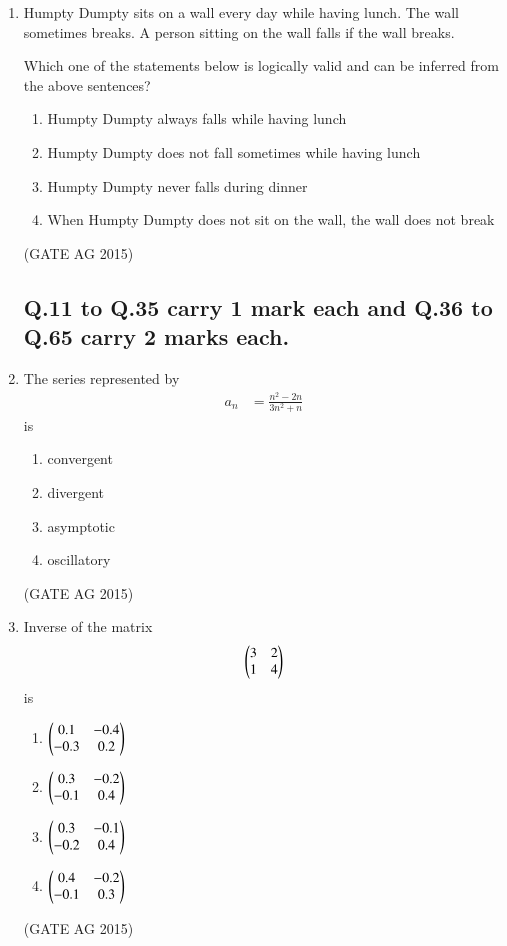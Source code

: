 \documentclass[journal,12pt,onecolumn]{IEEEtran}
\theoremstyle{remark}
\begin{document}
\begin{enumerate}
\item 

Humpty Dumpty sits on a wall every day while having lunch. The wall sometimes breaks. A person sitting on the wall falls if the wall breaks.


Which one of the statements below is logically valid and can be inferred from the above sentences?

\begin{enumerate}
    \item  Humpty Dumpty always falls while having lunch
    \item  Humpty Dumpty does not fall sometimes while having lunch
    \item  Humpty Dumpty never falls during dinner
    \item  When Humpty Dumpty does not sit on the wall, the wall does not break
\end{enumerate}
\hfill{(GATE AG 2015)}

\subsection{Q.11 to Q.35 carry 1 mark each and Q.36 to Q.65 carry 2 marks each.}


\item The series represented by 
\begin{align*}
a_n &= \frac{n^2 - 2n}{3n^2 + n}
\end{align*}
is
\begin{multicols}{4}
\begin{enumerate}
    \item  convergent
    \item  divergent
    \item  asymptotic
    \item  oscillatory
\end{enumerate}
\end{multicols}
\hfill{(GATE AG 2015)}

\item Inverse of the matrix 
\[
\begin{pmatrix}3 & 2 \\ 1 & 4\end{pmatrix}
\]
is
\begin{multicols}{4}
\begin{enumerate}
    \item  $\begin{pmatrix}0.1 & -0.4 \\ -0.3 & 0.2\end{pmatrix}$
    \item  $\begin{pmatrix}0.3 & -0.2 \\ -0.1 & 0.4\end{pmatrix}$
    \item  $\begin{pmatrix}0.3 & -0.1 \\ -0.2 & 0.4\end{pmatrix}$
    \item  $\begin{pmatrix}0.4 & -0.2 \\ -0.1 & 0.3\end{pmatrix}$
\end{enumerate}
\end{multicols}
\hfill{(GATE AG 2015)}


\end{enumerate}
\end{document}

